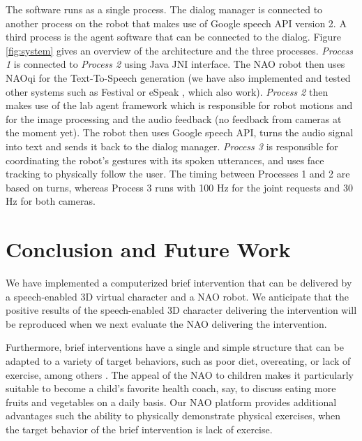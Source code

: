 \documentclass[letterpaper]{article}
\begin{document}
\begin{sloppy}
The software runs as a single process. The
dialog manager is connected to another process on the robot that makes use of Google speech API 
version 2. A third process is 
the agent software that can be connected to the dialog. Figure \ref{fig:system} gives an 
overview of the architecture and the three processes. {\em Process 1} is connected to {\em Process 
2} using 
Java JNI interface.  The NAO robot then uses NAOqi for the Text-To-Speech 
generation (we have also implemented and tested other systems such as Festival or 
eSpeak \cite{eSpeak}, which  also work). {\em Process 2} then 
makes 
use of the lab agent framework which is responsible for robot motions and 
for the image processing and the audio feedback (no feedback from cameras at the moment yet). The 
robot then uses Google speech API, turns the audio signal into text and sends it back to the dialog 
manager. {\em Process 3} is responsible for coordinating the robot's gestures with its spoken 
utterances, and uses face tracking to physically follow the user.  The timing between Processes 1 
and 2 are based on turns, whereas Process 3 runs with 100 Hz for the 
joint requests and 30 Hz for both cameras.

\section{Conclusion and Future Work} 

We have implemented a computerized brief intervention that can be delivered by a speech-enabled 3D 
virtual character and a NAO robot.  We anticipate that the positive results of the speech-enabled 3D 
character delivering the intervention will be reproduced when we next evaluate the NAO delivering 
the intervention.

Furthermore, brief interventions have a single and simple structure that can be adapted to a variety 
of target behaviors, such as poor diet, overeating, or lack of exercise, among others 
\cite{Moyer2002}.
The appeal of the NAO to children 
\cite{belpaeme2012multimodal} makes it particularly suitable to become a child's favorite health 
coach, say, to discuss eating more fruits and vegetables on a daily basis. Our NAO platform 
provides additional advantages such the ability to physically demonstrate physical exercises, when 
the target behavior of the brief intervention is lack of exercise.


   

\end{sloppy}
\end{document}
